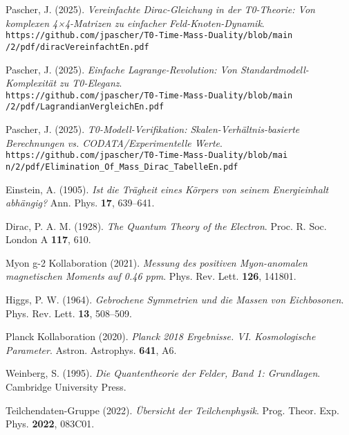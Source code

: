 \documentclass[12pt,a4paper]{article}
\theoremstyle{definition}
\theoremstyle{remark}
\begin{document}
	\begin{thebibliography}{99}
		Pascher, J. (2025). \textit{Vereinfachte Dirac-Gleichung in der T0-Theorie: Von komplexen 4×4-Matrizen zu einfacher Feld-Knoten-Dynamik}. \\
		\texttt{https://github.com/jpascher/T0-Time-Mass-Duality/blob/main\\/2/pdf/diracVereinfachtEn.pdf}
		
		Pascher, J. (2025). \textit{Einfache Lagrange-Revolution: Von Standardmodell-Komplexität zu T0-Eleganz}. \\
		\texttt{https://github.com/jpascher/T0-Time-Mass-Duality/blob/main\\/2/pdf/LagrandianVergleichEn.pdf}
		
		Pascher, J. (2025). \textit{T0-Modell-Verifikation: Skalen-Verhältnis-basierte Berechnungen vs. CODATA/Experimentelle Werte}. \\
		\texttt{https://github.com/jpascher/T0-Time-Mass-Duality/blob/mai\\n/2/pdf/Elimination\_Of\_Mass\_Dirac\_TabelleEn.pdf}
		
		Einstein, A. (1905). \textit{Ist die Trägheit eines Körpers von seinem Energieinhalt abhängig?} Ann. Phys. \textbf{17}, 639--641.
		
		Dirac, P. A. M. (1928). \textit{The Quantum Theory of the Electron}. Proc. R. Soc. London A \textbf{117}, 610.
		
		Myon g-2 Kollaboration (2021). \textit{Messung des positiven Myon-anomalen magnetischen Moments auf 0.46 ppm}. Phys. Rev. Lett. \textbf{126}, 141801.
		
		Higgs, P. W. (1964). \textit{Gebrochene Symmetrien und die Massen von Eichbosonen}. Phys. Rev. Lett. \textbf{13}, 508--509.
		
		Planck Kollaboration (2020). \textit{Planck 2018 Ergebnisse. VI. Kosmologische Parameter}. Astron. Astrophys. \textbf{641}, A6.
		
		Weinberg, S. (1995). \textit{Die Quantentheorie der Felder, Band 1: Grundlagen}. Cambridge University Press.
		
		Teilchendaten-Gruppe (2022). \textit{Übersicht der Teilchenphysik}. Prog. Theor. Exp. Phys. \textbf{2022}, 083C01.
	\end{thebibliography}
	
\end{document}
